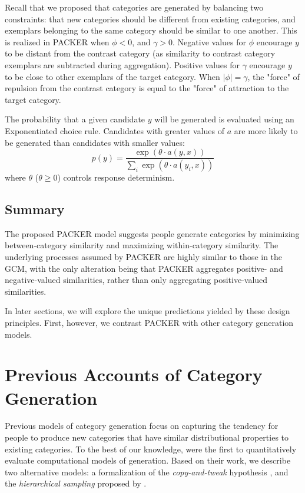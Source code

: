 \documentclass[10pt,letterpaper]{article}
\begin{document}
Recall that we proposed that categories are generated by balancing two constraints: that new categories should be different from existing categories, and exemplars belonging to the same category should be similar to one another. This is realized in PACKER when $\phi < 0$, and $\gamma > 0$. Negative values for $\phi$ encourage $y$ to be distant from the contrast category (as similarity to contrast category exemplars are subtracted during aggregation). Positive values for $\gamma$ encourage $y$ to be close to other exemplars of the target category. When $|\phi| = \gamma$, the "force" of repulsion from the contrast category is equal to the "force" of attraction to the target category.

The probability that a given candidate $y$ will be generated is evaluated using an Exponentiated \citet{luce1977choice} choice rule. Candidates with greater values of $a$ are more likely to be generated than candidates with smaller values:
\begin{equation}
p(y) = \dfrac
    { \exp( { \theta \cdot a(y, x) } ) }
    { \sum_i{ \exp( { \theta \cdot a(y_i, x) } ) } }
    \label{eq:packer-choice}
\end{equation}
where $\theta$ ($\theta \geq 0$) controls response determinism. 

\subsection{Summary}
The proposed PACKER model suggests people generate categories by minimizing between-category similarity and maximizing within-category similarity. The underlying processes assumed by PACKER are highly similar to those in the GCM, with the only alteration being that PACKER aggregates positive- and negative-valued similarities, rather than only aggregating positive-valued similarities.

In later sections, we will explore the unique predictions yielded by these design principles. First, however, we contrast PACKER with other category generation models. 


\section{Previous Accounts of Category Generation}

Previous models of category generation focus on capturing the tendency for people to produce new categories that have similar distributional properties to existing categories. To the best of our knowledge, \citet{jern2013probabilistic} were the first to quantitatively evaluate computational models of generation. Based on their work, we describe two alternative models: a formalization of the \textit{copy-and-tweak} hypothesis \citep{ward2002role,ward1995s}, and the \textit{hierarchical sampling} proposed by \citet{jern2013probabilistic}.
\end{document}
